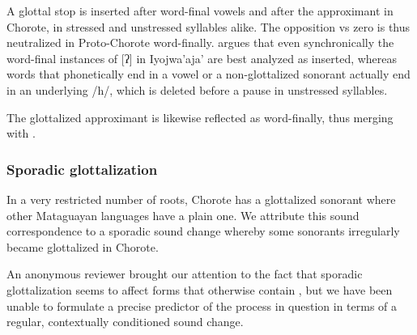 A glottal stop is inserted after word-final vowels and after the approximant  in Chorote, in stressed and unstressed syllables alike. The opposition  vs zero is thus neutralized in Proto-Chorote word-finally. \citet[85--89]{JC14b} argues that even synchronically the word-final instances of [ʔ] in Iyojwa’aja’ are best analyzed as inserted, whereas words that phonetically end in a vowel or a non-glottalized sonorant actually end in an underlying /h/, which is deleted before a pause in unstressed syllables.

\begin{exe}
    \ex \lick
    \ex \thorne
    \ex \namen
    \ex \algarrobof
    \ex \flyv
    \ex \elbow
    \ex \mancw
    \ex \tooln
    \ex \hand
    \ex \armadillo
    \ex \bottomn
    \ex \hornclub
    \ex \coldn
    \ex \squash
    \ex \daylhuma
    \ex \sleep
    \ex \savannahhawk
    \ex \newadj
    \ex \penis
    \ex \heel
    \ex \rain
    \ex \medicine
    \ex \costume
    \ex \wildcat
    \ex \movev
    \ex \worm
    \ex \belly
    \ex \neck
    \ex \price
    \ex \woman
    \ex \juice
    \ex \ripe
\end{exe}

The glottalized approximant  is likewise reflected as  word-finally, thus merging with .

\begin{exe}
    \ex \yicaay
    \ex \notafraid
    \ex \sunn
\end{exe}

\subsubsection{Sporadic glottalization}\label{ch-spontaneous-glot}
In a very restricted number of roots, Chorote has a glottalized sonorant where other Mataguayan languages have a plain one. We attribute this sound correspondence to a sporadic sound change whereby some sonorants irregularly became glottalized in Chorote.

\begin{exe}
    \ex \drinkv
    \ex \water
    \ex \many
    \ex \leg
\end{exe}

An anonymous reviewer brought our attention to the fact that sporadic glottalization seems to affect forms that otherwise contain , but we have been unable to formulate a precise predictor of the process in question in terms of a regular, contextually conditioned sound change.

